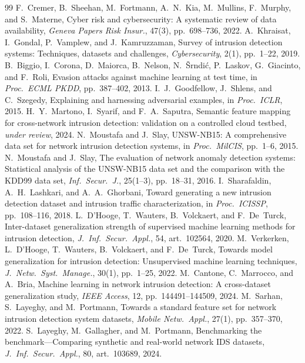 \documentclass[11pt,a4paper]{article}
\begin{document}
\begin{thebibliography}{99}
 F.~Cremer, B.~Sheehan, M.~Fortmann, A.~N.~Kia, M.~Mullins, F.~Murphy, and S.~Materne, Cyber risk and cybersecurity: A systematic review of data availability, \emph{Geneva Papers Risk Insur.}, 47(3), pp.~698--736, 2022.
 A.~Khraisat, I.~Gondal, P.~Vamplew, and J.~Kamruzzaman, Survey of intrusion detection systems: Techniques, datasets and challenges, \emph{Cybersecurity}, 2(1), pp.~1--22, 2019.
 B.~Biggio, I.~Corona, D.~Maiorca, B.~Nelson, N.~\v{S}rndi\'c, P.~Laskov, G.~Giacinto, and F.~Roli, Evasion attacks against machine learning at test time, in \emph{Proc.\ ECML PKDD}, pp.~387--402, 2013.
 I.~J.~Goodfellow, J.~Shlens, and C.~Szegedy, Explaining and harnessing adversarial examples, in \emph{Proc.\ ICLR}, 2015.
 H.~Y.~Martono, I.~Syarif, and F.~A.~Saputra, Semantic feature mapping for cross-network intrusion detection: validation on a controlled cloud testbed, \emph{under review}, 2024.
 N.~Moustafa and J.~Slay, UNSW-NB15: A comprehensive data set for network intrusion detection systems, in \emph{Proc.\ MilCIS}, pp.~1--6, 2015.
 N.~Moustafa and J.~Slay, The evaluation of network anomaly detection systems: Statistical analysis of the UNSW-NB15 data set and the comparison with the KDD99 data set, \emph{Inf.\ Secur.\ J.}, 25(1--3), pp.~18--31, 2016.
 I.~Sharafaldin, A.~H.~Lashkari, and A.~A.~Ghorbani, Toward generating a new intrusion detection dataset and intrusion traffic characterization, in \emph{Proc.\ ICISSP}, pp.~108--116, 2018.
 L.~D'Hooge, T.~Wauters, B.~Volckaert, and F.~De~Turck, Inter-dataset generalization strength of supervised machine learning methods for intrusion detection, \emph{J.\ Inf.\ Secur.\ Appl.}, 54, art.~102564, 2020.
 M.~Verkerken, L.~D'Hooge, T.~Wauters, B.~Volckaert, and F.~De~Turck, Towards model generalization for intrusion detection: Unsupervised machine learning techniques, \emph{J.\ Netw.\ Syst.\ Manage.}, 30(1), pp.~1--25, 2022.
 M.~Cantone, C.~Marrocco, and A.~Bria, Machine learning in network intrusion detection: A cross-dataset generalization study, \emph{IEEE Access}, 12, pp.~144491--144509, 2024.
 M.~Sarhan, S.~Layeghy, and M.~Portmann, Towards a standard feature set for network intrusion detection system datasets, \emph{Mobile Netw.\ Appl.}, 27(1), pp.~357--370, 2022.
 S.~Layeghy, M.~Gallagher, and M.~Portmann, Benchmarking the benchmark---Comparing synthetic and real-world network IDS datasets, \emph{J.\ Inf.\ Secur.\ Appl.}, 80, art.~103689, 2024.

\end{thebibliography}
\end{document}
